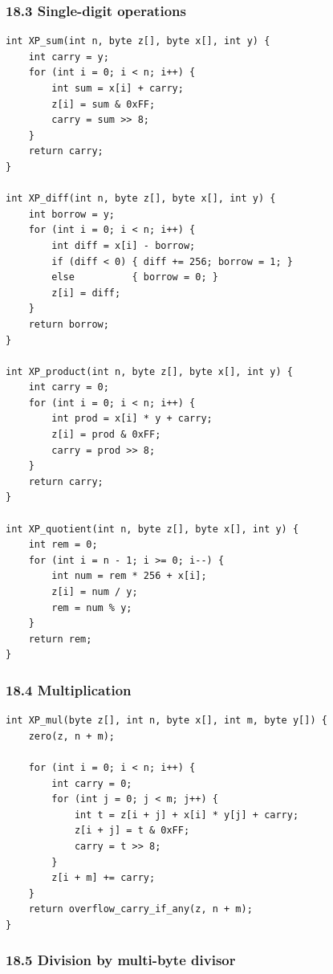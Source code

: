 \documentclass[11pt]{article}
\begin{document}
\subsubsection{18.3 Single-digit operations}\label{single-digit-operations}

\begin{verbatim}
int XP_sum(int n, byte z[], byte x[], int y) {
    int carry = y;
    for (int i = 0; i < n; i++) {
        int sum = x[i] + carry;
        z[i] = sum & 0xFF;
        carry = sum >> 8;
    }
    return carry;
}

int XP_diff(int n, byte z[], byte x[], int y) {
    int borrow = y;
    for (int i = 0; i < n; i++) {
        int diff = x[i] - borrow;
        if (diff < 0) { diff += 256; borrow = 1; }
        else          { borrow = 0; }
        z[i] = diff;
    }
    return borrow;
}

int XP_product(int n, byte z[], byte x[], int y) {
    int carry = 0;
    for (int i = 0; i < n; i++) {
        int prod = x[i] * y + carry;
        z[i] = prod & 0xFF;
        carry = prod >> 8;
    }
    return carry;
}

int XP_quotient(int n, byte z[], byte x[], int y) {
    int rem = 0;
    for (int i = n - 1; i >= 0; i--) {
        int num = rem * 256 + x[i];
        z[i] = num / y;
        rem = num % y;
    }
    return rem;
}
\end{verbatim}

\subsubsection{18.4 Multiplication}\label{multiplication}

\begin{verbatim}
int XP_mul(byte z[], int n, byte x[], int m, byte y[]) {
    zero(z, n + m);

    for (int i = 0; i < n; i++) {
        int carry = 0;
        for (int j = 0; j < m; j++) {
            int t = z[i + j] + x[i] * y[j] + carry;
            z[i + j] = t & 0xFF;
            carry = t >> 8;
        }
        z[i + m] += carry;
    }
    return overflow_carry_if_any(z, n + m);
}
\end{verbatim}

\subsubsection{18.5 Division by multi-byte divisor}\label{division-by-multi-byte-divisor}
\end{document}
